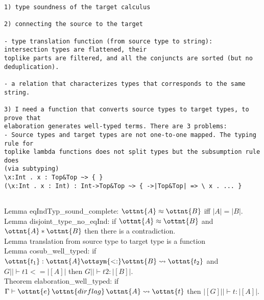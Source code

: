 \documentclass{article}
\begin{document}
\begin{verbatim}
1) type soundness of the target calculus

2) connecting the source to the target

- type translation function (from source type to string):
intersection types are flattened, their
toplike parts are filtered, and all the conjuncts are sorted (but no deduplication).

- a relation that characterizes types that corresponds to the same
string.

3) I need a function that converts source types to target types, to prove that
elaboration generates well-typed terms. There are 3 problems:
- Source types and target types are not one-to-one mapped. The typing rule for
toplike lambda functions does not split types but the subsumption rule does
(via subtyping)
\x:Int . x : Top&Top ~> { }
(\x:Int . x : Int) : Int->Top&Top ~> { ->|Top&Top| => \ x . ... }


\end{verbatim}

Lemma eqIndTyp\_sound\_complete: \quad $\ottnt{A}  \approx  \ottnt{B}$ iff $|A| = |B|$.\\

Lemma disjoint\_type\_no\_eqInd: \quad if $\ottnt{A}  \approx  \ottnt{B}$ and $\ottnt{A}  *  \ottnt{B}$ then
there is a contradiction.\\

Lemma translation from source type to target type is a function \\

Lemma cosub\_well\_typed: \quad if $\ottnt{t_{{\mathrm{1}}}}  :  \ottnt{A}  \ottsym{<:}  \ottnt{B}  \rightsquigarrow  \ottnt{t_{{\mathrm{2}}}}$ and $ G || \vdash t1 <= |[A]|$ then $ G || \vdash t2 : |[B]|$.\\

Theorem elaboration\_well\_typed: \quad if $\Gamma  \vdash  \ottnt{e} \, \ottnt{dirflag} \, \ottnt{A}  \rightsquigarrow  \ottnt{t}$ then
$|[ G ]|| \vdash t : |[A]|$.\\
\end{document}
